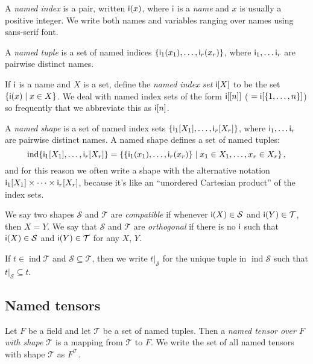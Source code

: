 \documentclass{article}
\newcommand{\tuple}[1]{\{#1\}}
\DeclareMathOperator{\tupleshape}{ind}
\newcommand{\tuplerestrict}[2]{\left.#1\right|_{#2}}
\begin{document}
A \emph{named index} is a pair, written $\mathsf{i}(x)$, where $\mathsf{i}$ is a \emph{name} and $x$ is usually a positive integer. We write both names and variables ranging over names using sans-serif font.

A \emph{named tuple} is a set of named indices $\tuple{\nidx{i\sub{1}}{x_1}, \ldots, \nidx{i\sub{r}}{x_r}}$, where $\mathsf{i_\text{$1$}}, \ldots \mathsf{i_\text{$r$}}$ are pairwise distinct names. 

If $\mathsf{i}$ is a name and $X$ is a set, define the \emph{named index set} $\mathsf{i}[X]$ to be the set $\{\mathsf{i}(x) \mid x \in X\}$. We deal with named index sets of the form $\mathsf{i}[[n]]$ (${}=\mathsf{i}[\{1, \ldots, n\}]$) so frequently that we abbreviate this as $\mathsf{i}[n]$.

A \emph{named shape} is a set of named index sets $\{\mathsf{i_\text{$1$}}[X_1], \ldots, \mathsf{i_\text{$r$}}[X_r]\}$, where $\mathsf{i_\text{$1$}}, \ldots \mathsf{i_\text{$r$}}$ are pairwise distinct names. A named shape defines a set of named tuples:
\begin{equation*}
\tupleshape \{\nset{i\sub{1}}{X_1}, \ldots, \nset{i\sub{r}}{X_r}\} = \left\{\tuple{\nidx{i\sub{1}}{x_1}, \ldots, \nidx{i\sub{r}}{x_r}} \mid x_1 \in X_1, \ldots, x_r \in X_r\right\},
\end{equation*}
and for this reason we often write a shape with the alternative notation $\mathsf{i_\text{$1$}}[X_1] \times \cdots \times \mathsf{i_\text{$r$}}[X_r]$, because it's like an ``unordered Cartesian product'' of the index sets.

We say two shapes $\mathcal{S}$ and $\mathcal{T}$ are \emph{compatible} if whenever $\mathsf{i}(X) \in \mathcal{S}$ and $\mathsf{i}(Y) \in \mathcal{T}$, then $X = Y$. We say that $\mathcal{S}$ and $\mathcal{T}$ are \emph{orthogonal} if there is no $\mathsf{i}$ such that $\mathsf{i}(X) \in \mathcal{S}$ and $\mathsf{i}(Y) \in \mathcal{T}$ for any $X$, $Y$.

If $t \in \tupleshape \mathcal{T}$ and $\mathcal{S} \subseteq \mathcal{T}$, then we write $\tuplerestrict{t}{\mathcal{S}}$ for the unique tuple in $\tupleshape{\mathcal{S}}$ such that $\tuplerestrict{t}{\mathcal{S}} \subseteq t$.

\subsection{Named tensors}

Let $F$ be a field and let $\mathcal{T}$ be a set of named tuples. Then a \emph{named tensor over $F$ with shape $\mathcal{T}$} is a mapping from $\mathcal{T}$ to $F$. We write the set of all named tensors with shape $\mathcal{T}$ as $F^{\mathcal{T}}$.
\end{document}
